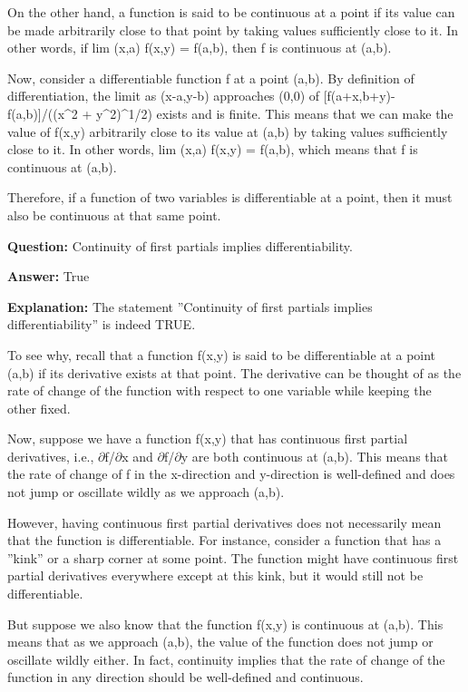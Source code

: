 \documentclass{article}
\begin{document}
On the other hand, a function is said to be continuous at a point if its value can be made arbitrarily close to that point by taking values sufficiently close to it. In other words, if lim (x,a) f(x,y) = f(a,b), then f is continuous at (a,b).

Now, consider a differentiable function f at a point (a,b). By definition of differentiation, the limit as (x-a,y-b) approaches (0,0) of [f(a+x,b+y)-f(a,b)]/((x{\textasciicircum}2 + y{\textasciicircum}2){\textasciicircum}1/2) exists and is finite. This means that we can make the value of f(x,y) arbitrarily close to its value at (a,b) by taking values sufficiently close to it. In other words, lim (x,a) f(x,y) = f(a,b), which means that f is continuous at (a,b).

Therefore, if a function of two variables is differentiable at a point, then it must also be continuous at that same point.
                
                \vspace{0.5cm} 
        
            
                \textbf {Question:} Continuity of first partials implies differentiability.
                
                \textbf{Answer:} True

                \textbf{Explanation:} The statement ''Continuity of first partials implies differentiability'' is indeed TRUE.

To see why, recall that a function f(x,y) is said to be differentiable at a point (a,b) if its derivative exists at that point. The derivative can be thought of as the rate of change of the function with respect to one variable while keeping the other fixed.

Now, suppose we have a function f(x,y) that has continuous first partial derivatives, i.e., \ensuremath{\partial}f/\ensuremath{\partial}x and \ensuremath{\partial}f/\ensuremath{\partial}y are both continuous at (a,b). This means that the rate of change of f in the x-direction and y-direction is well-defined and does not jump or oscillate wildly as we approach (a,b).

However, having continuous first partial derivatives does not necessarily mean that the function is differentiable. For instance, consider a function that has a ''kink'' or a sharp corner at some point. The function might have continuous first partial derivatives everywhere except at this kink, but it would still not be differentiable.

But suppose we also know that the function f(x,y) is continuous at (a,b). This means that as we approach (a,b), the value of the function does not jump or oscillate wildly either. In fact, continuity implies that the rate of change of the function in any direction should be well-defined and continuous.
\end{document}
